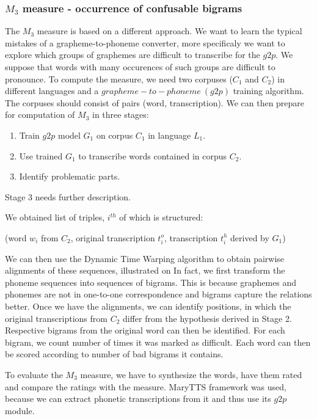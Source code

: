 \subsubsection{$M_3$ measure - occurrence of confusable bigrams}
The $M_3$ measure is based on a different approach.
We want to learn the typical mistakes of a grapheme-to-phoneme converter, more specificaly we want to explore which groups of graphemes are difficult to transcribe for the $g2p$.
We suppose that words with many occurences of such groups are difficult to pronounce.
To compute the measure, we need two corpuses ($C_1$ and $C_2$) in different languages and a $grapheme-to-phoneme\:(g2p)$ training algorithm.
The corpuses should consist of pairs (word, transcription).
We can then prepare for computation of $M_3$ in three stages:
\begin{enumerate}
\item Train $g2p$ model $G_1$ on corpus $C_1$ in language $L_1$.
\item Use trained $G_1$ to transcribe words contained in corpus $C_2$.
\item Identify problematic parts.
\end{enumerate}
Stage 3 needs further description.
\par
We obtained list of triples, $i^{th}$ of which is structured:
\begin{center}
(word $w_i$ from $C_2$, original transcription $t^o_i$, transcription $t^h_i$ derived by $G_1$)
\end{center}
We can then use the Dynamic Time Warping algorithm to obtain pairwise alignments of these sequences, illustrated on 
In fact, we first transform the phoneme sequences into sequences of bigrams.
This is because graphemes and phonemes are not in one-to-one correspondence and bigrams capture the relations better.
Once we have the alignments, we can identify positions, in which the original transcriptions from $C_2$ differ from the hypothesis derived in Stage 2.
Respective bigrams from the original word can then be identified.
For each bigram, we count number of times it was marked as difficult.
Each word can then be scored according to number of bad bigrams it contains.
\par
To evaluate the $M_3$ measure, we have to synthesize the words, have them rated and compare the ratings with the measure.
MaryTTS framework was used, because we can extract phonetic transcriptions from it and thus use its $g2p$ module.
